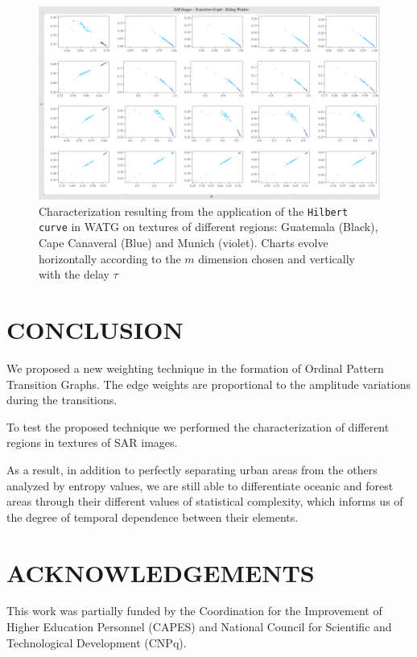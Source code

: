 \documentclass{isprs}
\begin{document}
\begin{figure}
	\centering
	\includegraphics[width=1.05\textwidth]{Figures/transitionGraphHilbert.pdf}
	\caption{Characterization resulting from the application of the \texttt{Hilbert curve} in WATG on textures of different regions: Guatemala (Black), Cape Canaveral (Blue) and Munich (violet). Charts evolve horizontally according to the $m$ dimension chosen and vertically with the delay $\tau$}
	\label{fig:Regions}
\end{figure}


\section{CONCLUSION}\label{Conclusion}

We proposed a new weighting technique in the formation of Ordinal Pattern Transition Graphs.
The edge weights are proportional to the amplitude variations during the transitions.

To test the proposed technique we performed the characterization of different regions in textures of SAR images.

As a result, in addition to perfectly separating urban areas from the others analyzed by entropy values, we are still able to differentiate oceanic and forest areas through their different values of statistical complexity, which informs us of the degree of temporal dependence between their elements.


%


\section*{ACKNOWLEDGEMENTS}\label{ACKNOWLEDGEMENTS}

This work was partially funded by the Coordination for the Improvement of Higher Education Personnel (CAPES) and National Council for Scientific and Technological Development (CNPq).
\end{document}
